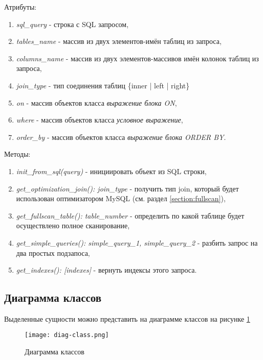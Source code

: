 Атрибуты:
\begin{enumerate}
\item \textit{sql_query} - строка с SQL запросом,
\item \textit{tables_name} - массив из двух элементов-имён таблиц из запроса,
\item \textit{columns_name} - массив из двух элементов-массивов имён колонок таблиц из запроса,
\item \textit{join_type} - тип соединения таблиц \{inner | left | right\}
\item \textit{on} - массив объектов класса \textit{выражение блока ON},
\item \textit{where} - массив объектов класса \textit{условное выражение},
\item \textit{order_by} - массив объектов класса \textit{выражение блока ORDER BY}.
\end{enumerate}

Методы:
\begin{enumerate}
\item \textit{init_from_sql(query)} - инициировать объект из SQL строки,
\item \textit{get_optimization_join(): join_type} - получить тип join, который будет использован оптимизатором MySQL (см. раздел \ref{section:fullscan}),
\item \textit{get_fullscan_table(): table_number} - определить по какой таблице будет осуществлено полное сканирование,
\item \textit{get_simple_queries(): simple_query_1, simple_query_2} - разбить запрос на два простых подзапоса,
\item \textit{get_indexes(): [indexes]} - вернуть индексы этого запроса.
\end{enumerate}

\subsection{Диаграмма классов}

Выделенные сущности можно представить на диаграмме классов на рисунке \ref{img:diag-class}

\begin{figure}[h!]
  \centering
  \texttt{[image: diag-class.png]}
  \caption{Диаграмма классов}
  \label{img:diag-class}
\end{figure}
